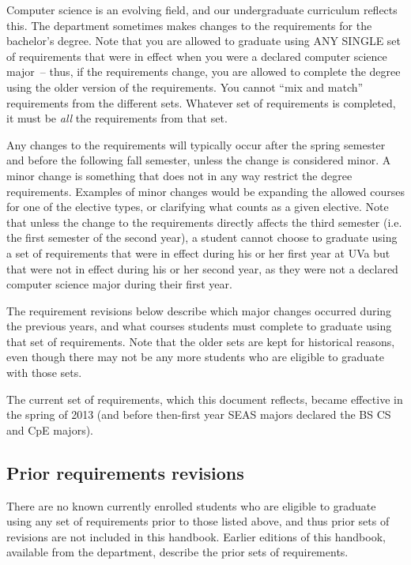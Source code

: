 Computer science is an evolving field, and our undergraduate
curriculum reflects this. The department sometimes makes changes to
the requirements for the bachelor's degree. Note that you are allowed
to graduate using ANY SINGLE set of requirements that were in effect
when you were a declared computer science major~-- thus, if the
requirements change, you are allowed to complete the degree using the
older version of the requirements. You cannot ``mix and match''
requirements from the different sets. Whatever set of requirements is
completed, it must be {\em all} the requirements from that set.

Any changes to the requirements will typically occur after the spring
semester and before the following fall semester, unless the change is
considered minor. A minor change is something that does not in any way
restrict the degree requirements. Examples of minor changes would be
expanding the allowed courses for one of the elective types, or
clarifying what counts as a given elective. Note that unless the
change to the requirements directly affects the third semester (i.e.
the first semester of the second year), a student cannot choose to
graduate using a set of requirements that were in effect during his or
her first year at UVa but that were not in effect during his or her
second year, as they were not a declared computer science major during
their first year.

The requirement revisions below describe which major changes occurred
during the previous years, and what courses students must complete to
graduate using that set of requirements. Note that the older sets are
kept for historical reasons, even though there may not be any more
students who are eligible to graduate with those sets.

The current set of requirements, which this document reflects, became
effective in the spring of 2013 (and before then-first year SEAS
majors declared the BS CS and CpE majors).

\subsection{Prior requirements revisions}

There are no known currently enrolled students who are eligible to graduate
using any set of requirements prior to those listed above, and thus
prior sets of revisions are not included in this handbook.  Earlier
editions of this handbook, available from the department, describe
the prior sets of requirements.

